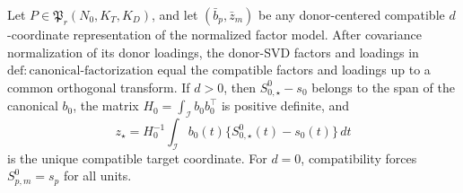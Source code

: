 Let \(P\in\mathfrak P_r(N_0,K_T,K_D)\), and let \((\bar b_p,\bar z_m)\) be any donor-centered compatible \(d\)-coordinate representation of the normalized factor model. After covariance normalization of its donor loadings, the donor-SVD factors and loadings in \(\mathrm{def:canonical\mbox{-}factorization}\) equal the compatible factors and loadings up to a common orthogonal transform. If \(d>0\), then \(S^0_{0,\star}-s_0\) belongs to the span of the canonical \(b_0\), the matrix \(H_0=\int_{\mathcal I}b_0b_0^\top\) is positive definite, and
\[
 z_\star=H_0^{-1}\int_{\mathcal I}b_0(t)
 \{S^0_{0,\star}(t)-s_0(t)\}\,dt
\]
is the unique compatible target coordinate. For \(d=0\), compatibility forces \(S^0_{p,m}=s_p\) for all units.
